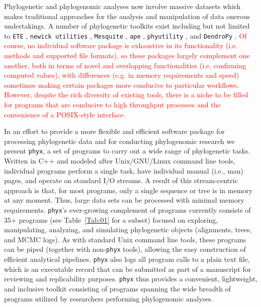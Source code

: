 \documentclass{bioinfo}
\begin{document}
Phylogenetic and phylogenomic analyses now involve massive datasets which makes traditional approaches for the analysis and manipulation of data onerous undertakings. A number of phylogenetic toolkits exist including but not limited to \texttt{ETE} \citep{HuertaCepas2016}, \texttt{newick utilities} \citep{JunierZdobnov2010}, \texttt{Mesquite} \citep{MaddisonMaddison2016}, \texttt{ape} \citep{Popescu2012}, \texttt{phyutility} \citep{SmithDunn2008}, and \texttt{DendroPy} \citep{SukumaranHolder2010}.
\textcolor{red}{Of course, no individual software package is exhaustive in its functionality (i.e. methods and supported file formats), so these packages largely complement one another, both in terms of novel and overlapping functionalities (i.e. confirming computed values), with differences (e.g. in memory requirements and speed) sometimes making certain packages more conducive to particular workflows. However, despite the rich diversity of existing tools, there is a niche to be filled for programs that are conducive to high throughput processes and the convenience of a POSIX-style interface.}

In an effort to provide a more flexible and efficient software package for processing phylogenetic data and for conducting phylogenomic research we present \texttt{phyx}, a set of programs to carry out a wide range of phylogenetic tasks. Written in C++ and modeled after Unix/GNU/Linux command line tools, individual programs perform a single task, have individual manual (i.e., man) pages, and operate on standard I/O streams. A result of this stream-centric approach is that, for most programs, only a single sequence or tree is in memory at any moment. Thus, large data sets can be processed with minimal memory requirements. \texttt{phyx}'s ever-growing complement of programs currently consists of 35+ programs (see Table~\ref{Tab:01} for a subset) focused on exploring, manipulating, analyzing, and simulating phylogenetic objects (alignments, trees, and MCMC logs). As with standard Unix command line tools, these programs can be piped (together with non-\texttt{phyx} tools), allowing the easy construction of efficient analytical pipelines. \texttt{phyx} also logs all program calls to a plain text file, which is an executable record that can be submitted as part of a manuscript for reviewing and replicability purposes. \texttt{phyx} thus provides a convenient, lightweight, and inclusive toolkit consisting of programs spanning the wide breadth of programs utilized by researchers performing phylogenomic analyses.\vspace*{-12pt}
\end{document}
